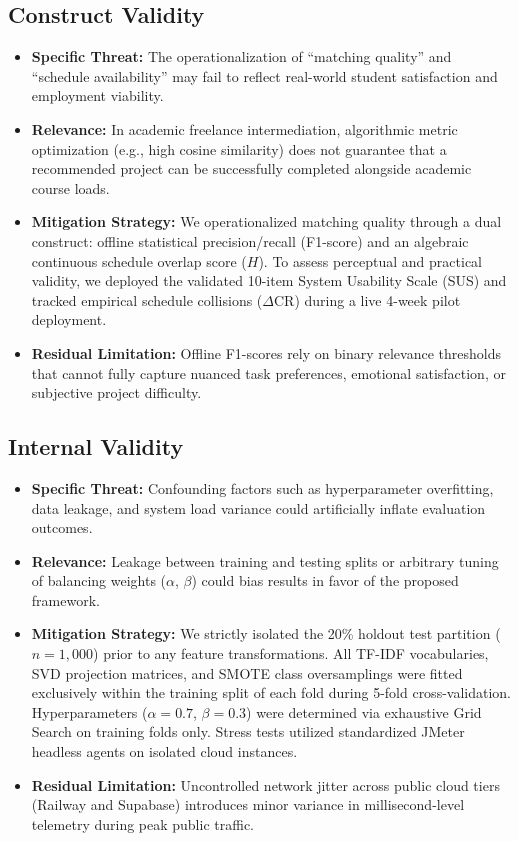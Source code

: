 \documentclass[a4paper,fleqn]{cas-dc}
\begin{document}
\subsection{Construct Validity}
\begin{itemize}
    \item \textbf{Specific Threat:} The operationalization of ``matching quality'' and ``schedule availability'' may fail to reflect real-world student satisfaction and employment viability.
    \item \textbf{Relevance:} In academic freelance intermediation, algorithmic metric optimization (e.g., high cosine similarity) does not guarantee that a recommended project can be successfully completed alongside academic course loads.
    \item \textbf{Mitigation Strategy:} We operationalized matching quality through a dual construct: offline statistical precision/recall (F1-score) and an algebraic continuous schedule overlap score ($H$). To assess perceptual and practical validity, we deployed the validated 10-item System Usability Scale (SUS) \cite{bangor2008, brooke1996} and tracked empirical schedule collisions ($\Delta\text{CR}$) during a live 4-week pilot deployment.
    \item \textbf{Residual Limitation:} Offline F1-scores rely on binary relevance thresholds that cannot fully capture nuanced task preferences, emotional satisfaction, or subjective project difficulty.
\end{itemize}

\subsection{Internal Validity}
\begin{itemize}
    \item \textbf{Specific Threat:} Confounding factors such as hyperparameter overfitting, data leakage, and system load variance could artificially inflate evaluation outcomes.
    \item \textbf{Relevance:} Leakage between training and testing splits or arbitrary tuning of balancing weights ($\alpha$, $\beta$) could bias results in favor of the proposed framework.
    \item \textbf{Mitigation Strategy:} We strictly isolated the 20\% holdout test partition ($n = 1,000$) prior to any feature transformations. All TF-IDF vocabularies, SVD projection matrices, and SMOTE class oversamplings were fitted exclusively within the training split of each fold during 5-fold cross-validation. Hyperparameters ($\alpha = 0.7$, $\beta = 0.3$) were determined via exhaustive Grid Search on training folds only. Stress tests utilized standardized JMeter headless agents on isolated cloud instances.
    \item \textbf{Residual Limitation:} Uncontrolled network jitter across public cloud tiers (Railway and Supabase) introduces minor variance in millisecond-level telemetry during peak public traffic.
\end{itemize}
\end{document}
